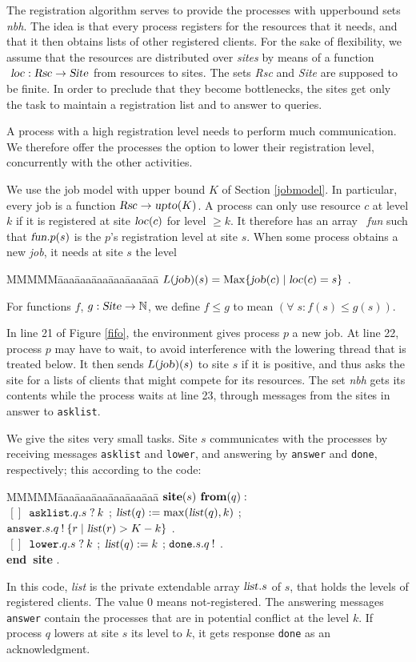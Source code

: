 \documentclass[10pt]{article} \usepackage[english]{babel}
\newenvironment{tab}{\begin{tabbing}
MMMMM\=aaa\=aaa\=aaa\=aaa\=aaa\=aaa\= \kill}{\end{tabbing}}
\def\Nat   {\mbox{$\mathbb{N}$}}
\def\bar   {\mbox{$\,[ \! ]\,$}}
\def\all   {\forall\;}
\def\S #1/{\mbox {\textsl{#1}}}
\def\B #1/{\mbox {\textbf{#1}}}
\def\R #1/{\mbox {\textrm{#1}}}
\def\T #1/{\mbox {\texttt{#1}}}
\begin{document}
The registration algorithm serves to provide the processes with
upperbound sets \S nbh/.  The idea is that every process registers for
the resources that it needs, and that it then obtains lists of other
registered clients.  For the sake of flexibility, we assume that the
resources are distributed over \emph{sites} by means of a function $\S
loc/:\S Rsc/ \to \S Site/ $ from resources to sites.  The sets \S Rsc/
and \S Site/ are supposed to be finite.  In order to preclude that
they become bottlenecks, the sites get only the task to maintain a
registration list and to answer to queries.

A process with a high registration level needs to perform much
communication.  We therefore offer the processes the option to lower
their registration level, concurrently with the other activities.

We use the job model with upper bound $K$ of Section \ref{jobmodel}.
In particular, every job is a function $\S Rsc/\to\S upto/(K)$.  A
process can only use resource $c$ at level $k$ if it is registered at
site $\S loc/(c)$ for level $\geq k$.  It therefore has an array \S
fun/ such that $\S fun/.p(s)$ is the $p$'s registration level at site
$s$.  When some process obtains a new \S job/, it needs at site $s$
the level
\begin{tab}
\> $ L(\S job/)(s) = \R Max/ \{\S job/(c) \mid \S loc/(c) = s\}$ .
\end{tab}
For functions $f$, $g:\S Site/\to\Nat$, we define $f\leq g$ to mean
$(\all s: f(s) \leq g(s))$.  

In line 21 of Figure \ref{fifo}, the environment gives process $p$ a
new job.  At line 22, process $p$ may have to wait, to avoid
interference with the lowering thread that is treated below.  It then
sends $L(\S job/)(s)$ to site $s$ if it is positive, and thus asks the
site for a lists of clients that might compete for its resources.  The
set \S nbh/ gets its contents while the process waits at line 23,
through messages from the sites in answer to \T asklist/.

We give the sites very small tasks.  Site $s$ communicates with the
processes by receiving messages \T asklist/ and \T lower/, and
answering by \T answer/ and \T done/, respectively; this
according to the code:
\begin{tab}
\>\+\+ $\B site/(s)\B\ from/(q):$\\
$\bar$ \> $ \T asklist/.q.s\;?\:k $ ;
 $ \S list/(q) := \R max/(\S list/(q), k) $ ;\\
\> $ \T answer/.s.q\:!\:\{r \mid \S list/(r) > K-k \} $ .\\
$\bar$ \> $ \T lower/.q.s\;?\:k $ ; $ \S list/(q):= k $ ;
 $ \T done/.s.q\:! $ .\-\\
\B end site/ .
\end{tab}
In this code, \S list/ is the private extendable array $\S list/.s$ of
$s$, that holds the levels of registered clients.  The value 0 means
not-registered.  The answering messages \T answer/ contain the
processes that are in potential conflict at the level $k$.  If process
$q$ lowers at site $s$ its level to $k$, it gets response \T done/ as
an acknowledgment.
\end{document}
